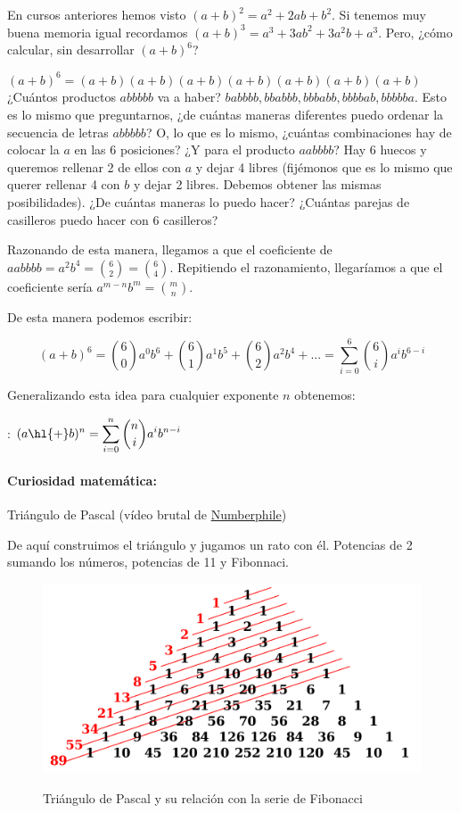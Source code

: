 
En cursos anteriores hemos visto $(a+b)^2 = a^2+2ab+b^2$. Si tenemos muy buena memoria igual recordamos $(a+b)^3 = a^3+3ab^2+3a^2b+a^3$. Pero, ¿cómo calcular, sin desarrollar $(a+b)^6$? 

$(a+b)^6 = (a+b)(a+b)(a+b)(a+b)(a+b)(a+b)(a+b)$ ¿Cuántos productos $abbbbb$ va a haber? $babbbb,bbabbb,bbbabb,bbbbab,bbbbba$. Esto es lo mismo que preguntarnos, ¿de cuántas maneras diferentes puedo ordenar la secuencia de letras $abbbbb$? O, lo que es lo mismo, ¿cuántas combinaciones hay de colocar la $a$ en las 6 posiciones?
%
¿Y para el producto $aabbbb$? Hay 6 huecos y queremos rellenar 2 de ellos con $a$ y dejar 4 libres (fijémonos que es lo mismo que querer rellenar 4 con $b$ y dejar 2 libres. Debemos obtener las mismas posibilidades). ¿De cuántas maneras lo puedo hacer? ¿Cuántas parejas de casilleros puedo hacer con 6 casilleros?

Razonando de esta manera, llegamos a que el coeficiente de $aabbbb = a^2b^4 = \binom{6}{2}=\binom{6}{4}$. Repitiendo el razonamiento, llegaríamos a que el coeficiente sería $a^{m-n}b^m = \binom{m}{n}$. 

De esta manera podemos escribir:

\[
	(a+b)^6 = \binom{6}{0}a^0b^6 + \binom{6}{1}a^1b^5 + \binom{6}{2}a^2b^4 + ... = \sum_{i=0}^6 \binom{6}{i}a^ib^{6-i}
\]

Generalizando esta idea para cualquier exponente $n$ obtenemos:

:
$
\displaystyle (a\text{\hl{+}}b)^n = \sum_{i=0}^n \binom{n}{i} a^ib^{n-i}
$

\paragraph{Curiosidad matemática:} Triángulo de Pascal (vídeo brutal de \href{https://www.youtube.com/watch?v=0iMtlus-afo}{Numberphile})

De aquí construimos el triángulo y jugamos un rato con él. Potencias de 2 sumando los números, potencias de 11 y Fibonnaci.

\begin{figure}[hbpt]
	\centering
	\includegraphics[scale=0.17]{img/Pascal.png}
	\label{img::TrianguloPascal}
	\caption{Triángulo de Pascal y su relación con la serie de Fibonacci}
\end{figure}




